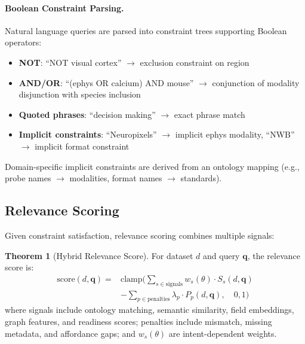 \documentclass{article}
\theoremstyle{definition}
\newtheorem{theorem}{Theorem}[section]
\newcommand{\query}{\mathbf{q}}
\newcommand{\score}{\text{score}}
\begin{document}
\paragraph{Boolean Constraint Parsing.} Natural language queries are parsed into constraint trees supporting Boolean operators:
\begin{itemize}
    \item \textbf{NOT}: ``NOT visual cortex'' $\rightarrow$ exclusion constraint on region
    \item \textbf{AND/OR}: ``(ephys OR calcium) AND mouse'' $\rightarrow$ conjunction of modality disjunction with species inclusion
    \item \textbf{Quoted phrases}: ``decision making'' $\rightarrow$ exact phrase match
    \item \textbf{Implicit constraints}: ``Neuropixels'' $\rightarrow$ implicit ephys modality, ``NWB'' $\rightarrow$ implicit format constraint
\end{itemize}
Domain-specific implicit constraints are derived from an ontology mapping (e.g., probe names $\rightarrow$ modalities, format names $\rightarrow$ standards).

\subsection{Relevance Scoring}

Given constraint satisfaction, relevance scoring combines multiple signals:

\begin{theorem}[Hybrid Relevance Score]
\label{thm:hybrid-score}
For dataset $d$ and query $\query$, the relevance score is:
\begin{equation}
\begin{split}
\score(d, \query) = &\text{clamp}\Bigg(
    \sum_{s \in \text{signals}} w_s(\theta) \cdot S_s(d, \query) \\
    &- \sum_{p \in \text{penalties}} \lambda_p \cdot P_p(d, \query), \quad 0, 1\Bigg)
\end{split}
\end{equation}
where signals include ontology matching, semantic similarity, field embeddings, graph features, and readiness scores; penalties include mismatch, missing metadata, and affordance gaps; and $w_s(\theta)$ are intent-dependent weights.
\end{theorem}

\end{document}
